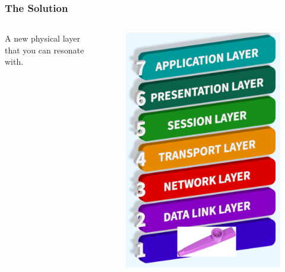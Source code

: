 \documentclass[
	11pt, %
]{beamer}
\begin{document}
\begin{frame}
  \frametitle{The Solution}

  \begin{columns}[c] %
    \begin{column}{0.4\textwidth} %
      A new physical layer that you can resonate with.


    \end{column}
    \begin{column}{0.4\textwidth} %
      \begin{center}
        \begin{figure}
          \includegraphics[width=1\linewidth]{new_osi_model.png}
        \end{figure}
      \end{center}
    \end{column}
  \end{columns}

\end{frame}
\end{document}
